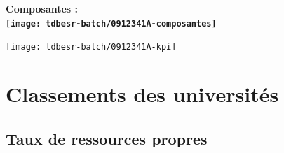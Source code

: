 \documentclass[12pt,french,]{article}
\def\arraystretch{1.5}
\begin{document}
\hrulefill

\begin{center} \bf Composantes : \\  
\texttt{[image: tdbesr-batch/0912341A-composantes]} \end{center}

\begin{center}\texttt{[image: tdbesr-batch/0912341A-kpi]} \end{center}

\newpage

\hypertarget{classements-des-universituxe9s}{%
\section{Classements des
universités}\label{classements-des-universituxe9s}}

\footnotesize
\def\arraystretch{1.4}

\hypertarget{taux-de-ressources-propres}{%
\subsection{Taux de ressources
propres}\label{taux-de-ressources-propres}}
\end{document}
